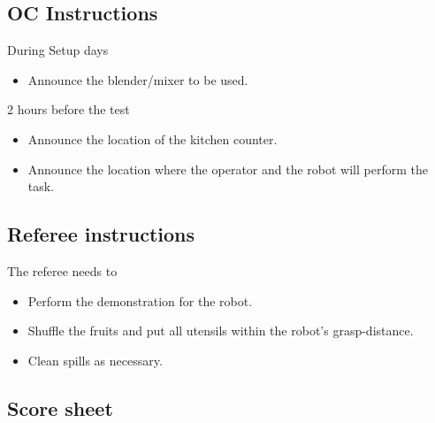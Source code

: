 \subsection*{OC Instructions}
During Setup days
\begin{itemize}[nosep]
	\item Announce the blender/mixer to be used.
\end{itemize}

2 hours before the test
\begin{itemize}[nosep]
	\item Announce the location of the kitchen counter.
	\item Announce the location where the operator and the robot will perform the task.
\end{itemize}

\subsection*{Referee instructions}
The referee needs to
\begin{itemize}[nosep]
	\item Perform the demonstration for the robot.
	\item Shuffle the fruits and put all utensils within the robot's grasp-distance.
	\item Clean spills as necessary.
\end{itemize}


\subsection*{Score sheet}

